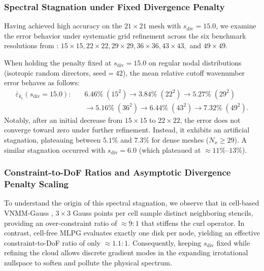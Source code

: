 \documentclass[VANCOUVER,Times1COL]{WileyNJD-v5}
\begin{document}
\subsubsection{Spectral Stagnation under Fixed Divergence Penalty}
\label{subsubsec:stagnation_fixed_sdiv}

Having achieved high accuracy on the $21 \times 21$ mesh with $s_{\mathrm{div}} = 15.0$, we examine the error behavior under systematic grid refinement across the six benchmark resolutions from \cite{stable_vnmm2d_2026}: $15 \times 15, 22 \times 22, 29 \times 29, 36 \times 36, 43 \times 43,$ and $49 \times 49$.

When holding the penalty fixed at $s_{\mathrm{div}} = 15.0$ on regular nodal distributions (isotropic random directors, $\text{seed}=42$), the mean relative cutoff wavenumber error behaves as follows:
\begin{equation}
    \begin{aligned}
        \overline{\varepsilon}_{k_c}(s_{\mathrm{div}}=15.0): \quad & 6.46\% \; (15^2) \longrightarrow 3.84\% \; (22^2) \longrightarrow 5.27\% \; (29^2)                  \\
                                                                   & \longrightarrow 5.16\% \; (36^2) \longrightarrow 6.44\% \; (43^2) \longrightarrow 7.32\% \; (49^2).
    \end{aligned}
\end{equation}
Notably, after an initial decrease from $15 \times 15$ to $22 \times 22$, the error does not converge toward zero under further refinement. Instead, it exhibits an artificial stagnation, plateauing between $5.1\%$ and $7.3\%$ for dense meshes ($N_x \ge 29$). A similar stagnation occurred with $s_{\mathrm{div}} = 6.0$ (which plateaued at $\approx 11\%\text{--}13\%$).

\subsubsection{Constraint-to-DoF Ratios and Asymptotic Divergence Penalty Scaling}
\label{subsubsec:constraint_ratio_scaling}

To understand the origin of this spectral stagnation, we observe that in cell-based VNMM-Gauss \cite{stable_vnmm2d_2026}, $3 \times 3$ Gauss points per cell sample distinct neighboring stencils, providing an over-constraint ratio of $\approx 9:1$ that stiffens the curl operator. In contrast, cell-free MLPG evaluates exactly one disk per node, yielding an effective constraint-to-DoF ratio of only $\approx 1.1:1$. Consequently, keeping $s_{\mathrm{div}}$ fixed while refining the cloud allows discrete gradient modes in the expanding irrotational nullspace to soften and pollute the physical spectrum.
\end{document}
